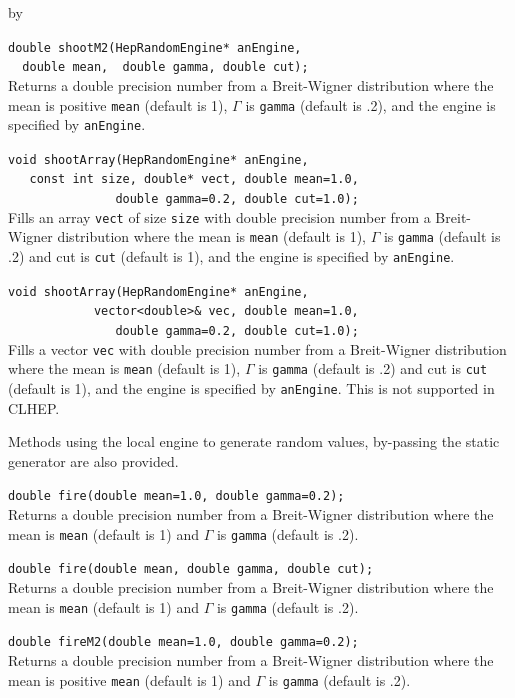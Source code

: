 \documentclass[twoside]{article}
\newcommand{\comp}[1]{\texttt{#1}}%
\newcommand{\entrylabel}[1]{\mbox{\textbf{{#1}}}\hfil}%
\newenvironment{entry}
{\begin{list}{}%
    {\renewcommand{\makelabel}{\entrylabel}%
     \setlength{\labelwidth}{90pt}%
     \setlength{\leftmargin}{\labelwidth}
     \advance\leftmargin by \labelsep%
      }%
    }%
  {\end{list}}
\newcommand{\Entrylabel}[1]%
{\raisebox{0pt}[1ex][0pt]{\makebox[\labelwidth][l]%
    {\parbox[t]{\labelwidth}{\hspace{0pt}\textbf{{#1}}}}}}
\newenvironment{Entry}%
{\renewcommand{\entrylabel}{\Entrylabel}\begin{entry}}%
  {\end{entry}}
\begin{document}
\begin{description}
\begin{Entry}
    \verb+double shootM2(HepRandomEngine* anEngine,+\\
    \verb+  double mean,  double gamma, double cut);+\\
    Returns a double precision number from a Breit-Wigner
    distribution where the mean is positive \comp{mean} (default is 1),
    $\Gamma$ is \comp{gamma} (default is .2), and the engine
    is specified by \comp{anEngine}.
    
    \verb+void shootArray(HepRandomEngine* anEngine,+\\
    \verb+   const int size, double* vect, double mean=1.0,+\\
    \verb+               double gamma=0.2, double cut=1.0);+\\
    Fills an array \comp{vect} of size \comp{size} with double
    precision number from a Breit-Wigner
    distribution where the mean is \comp{mean} (default is 1),
    $\Gamma$ is \comp{gamma} (default is .2) and cut is
    \comp{cut} (default is 1), and the engine is specified
    by \comp{anEngine}.

    \verb+void shootArray(HepRandomEngine* anEngine,+\\
    \verb+            vector<double>& vec, double mean=1.0,+\\
    \verb+               double gamma=0.2, double cut=1.0);+\\
    Fills a vector \comp{vec} with double
    precision number from a Breit-Wigner
    distribution where the mean is \comp{mean} (default is 1),
    $\Gamma$ is \comp{gamma} (default is .2) and cut is
    \comp{cut} (default is 1), and the engine is specified
    by \comp{anEngine}.  This is not supported in CLHEP.
    
    Methods using the local engine to generate random values, by-passing
    the static generator are also provided.
    
    \verb+double fire(double mean=1.0, double gamma=0.2);+\\
    Returns a double precision number from a Breit-Wigner
    distribution where the mean is \comp{mean} (default is 1)
    and $\Gamma$ is \comp{gamma} (default is .2).
    
    \verb+double fire(double mean, double gamma, double cut);+\\
    Returns a double precision number from a Breit-Wigner
    distribution where the mean is \comp{mean} (default is 1)
    and $\Gamma$ is \comp{gamma} (default is .2).
    
    \verb+double fireM2(double mean=1.0, double gamma=0.2);+\\
    Returns a double precision number from a Breit-Wigner
    distribution where the mean is positive \comp{mean} (default is 1)
    and $\Gamma$ is \comp{gamma} (default is .2).
    

\end{Entry}
\end{description}
\end{document}
